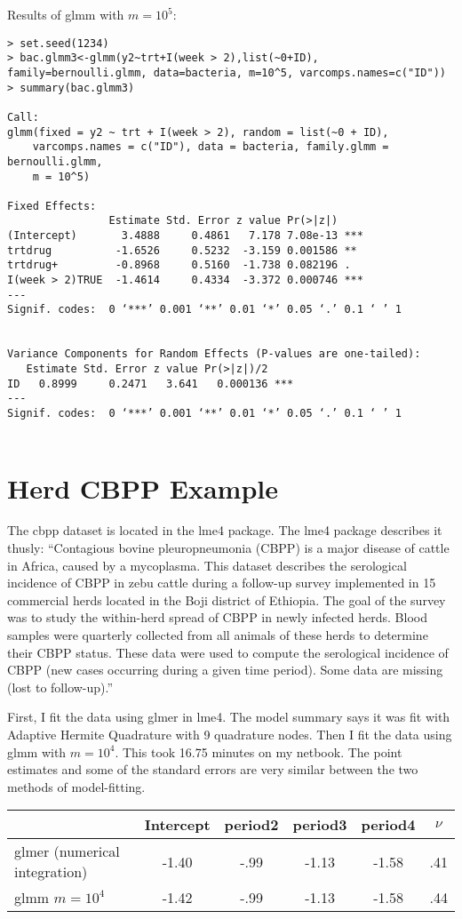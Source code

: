 \documentclass{article}
\begin{document}
Results  of glmm with $m=10^5$:
\begin{verbatim}
> set.seed(1234)
> bac.glmm3<-glmm(y2~trt+I(week > 2),list(~0+ID), family=bernoulli.glmm, data=bacteria, m=10^5, varcomps.names=c("ID"))
> summary(bac.glmm3)

Call:
glmm(fixed = y2 ~ trt + I(week > 2), random = list(~0 + ID), 
    varcomps.names = c("ID"), data = bacteria, family.glmm = bernoulli.glmm, 
    m = 10^5)

Fixed Effects:
                Estimate Std. Error z value Pr(>|z|)    
(Intercept)       3.4888     0.4861   7.178 7.08e-13 ***
trtdrug          -1.6526     0.5232  -3.159 0.001586 ** 
trtdrug+         -0.8968     0.5160  -1.738 0.082196 .  
I(week > 2)TRUE  -1.4614     0.4334  -3.372 0.000746 ***
---
Signif. codes:  0 ‘***’ 0.001 ‘**’ 0.01 ‘*’ 0.05 ‘.’ 0.1 ‘ ’ 1


Variance Components for Random Effects (P-values are one-tailed):
   Estimate Std. Error z value Pr(>|z|)/2    
ID   0.8999     0.2471   3.641   0.000136 ***
---
Signif. codes:  0 ‘***’ 0.001 ‘**’ 0.01 ‘*’ 0.05 ‘.’ 0.1 ‘ ’ 1


\end{verbatim}

\section{Herd CBPP Example}
The cbpp dataset is located in the lme4 package. The lme4 package describes it thusly: ``Contagious bovine pleuropneumonia (CBPP) is a major disease of cattle in Africa, caused by a
mycoplasma. This dataset describes the serological incidence of CBPP in zebu cattle during a
follow-up survey implemented in 15 commercial herds located in the Boji district of Ethiopia. The
goal of the survey was to study the within-herd spread of CBPP in newly infected herds. Blood
samples were quarterly collected from all animals of these herds to determine their CBPP status.
These data were used to compute the serological incidence of CBPP (new cases occurring during a given time period). Some data are missing (lost to follow-up).''

First, I fit the data using glmer in lme4. The model summary says it was fit with Adaptive Hermite Quadrature with 9 quadrature nodes. Then I fit the data using glmm with $m=10^4$. This took 16.75 minutes on my netbook. The point estimates and some of the standard errors are very similar between the two  methods of model-fitting. 

\begin{tabular}{lccccc}
& Intercept & period2 & period3 & period4 & $\nu$ \\ \hline
glmer (numerical integration) & -1.40 & -.99 & -1.13 & -1.58 & .41\\
glmm $m=10^4$ & -1.42 & -.99 & -1.13 & -1.58 & .44 \\
\end{tabular}
\end{document}
